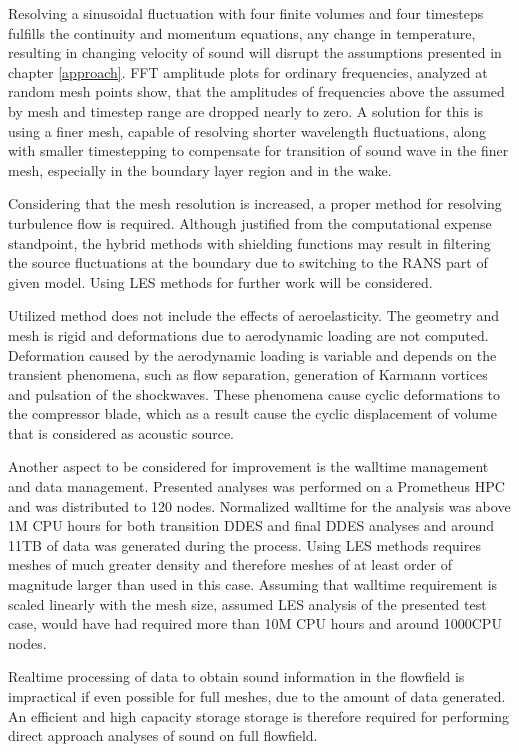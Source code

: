 Resolving a sinusoidal fluctuation with four finite volumes and four timesteps fulfills the continuity and momentum equations, any change in temperature, resulting in changing velocity of sound will disrupt the assumptions presented in chapter \ref{approach}. FFT amplitude plots for ordinary frequencies, analyzed at random mesh points show, that the amplitudes of frequencies above the assumed by mesh and timestep range are dropped nearly to zero. A solution for this is using a finer mesh, capable of resolving shorter wavelength fluctuations, along with smaller timestepping to compensate for transition of sound wave in the finer mesh, especially in the boundary layer region and in the wake.

Considering that the mesh resolution is increased, a proper method for resolving turbulence flow is required. Although justified from the computational expense standpoint, the hybrid methods with shielding functions may result in filtering the source fluctuations at the boundary due to switching to the RANS part of given model. Using LES methods for further work will be considered.

Utilized method does not include the effects of aeroelasticity. The geometry and mesh is rigid and deformations due to aerodynamic loading are not computed. Deformation caused by the aerodynamic loading is variable and depends on the transient phenomena, such as flow separation, generation of Karmann vortices and pulsation of the shockwaves. These phenomena cause cyclic deformations to the compressor blade, which as a result cause the cyclic displacement of volume that is considered as acoustic source.

Another aspect to be considered for improvement is the walltime management and data management. Presented analyses was performed on a Prometheus HPC and was distributed to 120 nodes. Normalized walltime for the analysis was above 1M CPU hours for both transition DDES and final DDES analyses and around 11TB of data was generated during the process. Using LES methods requires meshes of much greater density and therefore meshes of at least order of magnitude larger than used in this case. Assuming that walltime requirement is scaled linearly with the mesh size, assumed LES analysis of the presented test case, would have had required more than 10M CPU hours and around 1000CPU nodes.

Realtime processing of data to obtain sound information in the flowfield is impractical if even possible for full meshes, due to the amount of data generated. An efficient and high capacity storage storage is therefore required for performing direct approach analyses of sound on full flowfield.

